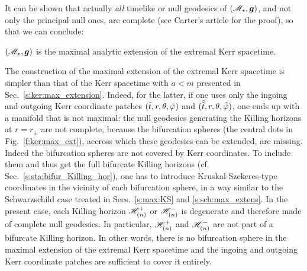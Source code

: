 It can be shown that actually \emph{all} timelike or null
geodesics of $(\mathscr{M}_*,\bm{g})$, and not only the principal null ones, are complete
(see Carter's article \cite{Carte68a} for the proof), so that we can conclude:
\begin{greybox}
$(\mathscr{M}_*,\bm{g})$ is the maximal analytic extension of the
extremal Kerr spacetime.
\end{greybox}

\begin{remark}
The construction of the maximal extension of the extremal Kerr spacetime
is simpler than that of the Kerr spacetime with $a<m$ presented
in Sec.~\ref{s:ker:max_extension}. Indeed, for the latter, if one uses
only the ingoing and outgoing Kerr coordinate patches $({\tilde t},r,\theta,{\tilde\varphi})$
and $(\tilde{{\tilde t}},r,\theta,\tilde{{\tilde\varphi}})$, one ends up with a manifold that
is not maximal: the null geodesics generating the Killing horizons
at $r=r_\pm$ are not complete, because the bifurcation spheres
(the central dots in Fig.~\ref{f:ker:max_ext}), accross which these geodesics
can be extended, are missing.
Indeed the bifurcation spheres are not covered by Kerr coordinates.
To include them and thus get the full bifurcate Killing horizons
(cf. Sec.~\ref{s:sta:bifur_Killing_hor}), one has to introduce Kruskal-Szekeres-type
coordinates in the vicinity of each bifurcation sphere, in a way similar to
the Schwarzschild case treated in Secs.~\ref{s:max:KS} and \ref{s:sch:max_extens}.
In the present case, each Killing horizon $\mathscr{H}^+_{(n)}$ or $\mathscr{H}^-_{(n)}$
is degenerate and therefore made of complete null geodesics. In particular,
$\mathscr{H}^+_{(n)}$ and $\mathscr{H}^-_{(n)}$ are not part of a bifurcate Killing horizon. In other words, there
is no bifurcation sphere in the maximal extension of the extremal Kerr spacetime
and the ingoing and outgoing Kerr coordinate patches
are sufficient to cover it entirely.
\end{remark}

